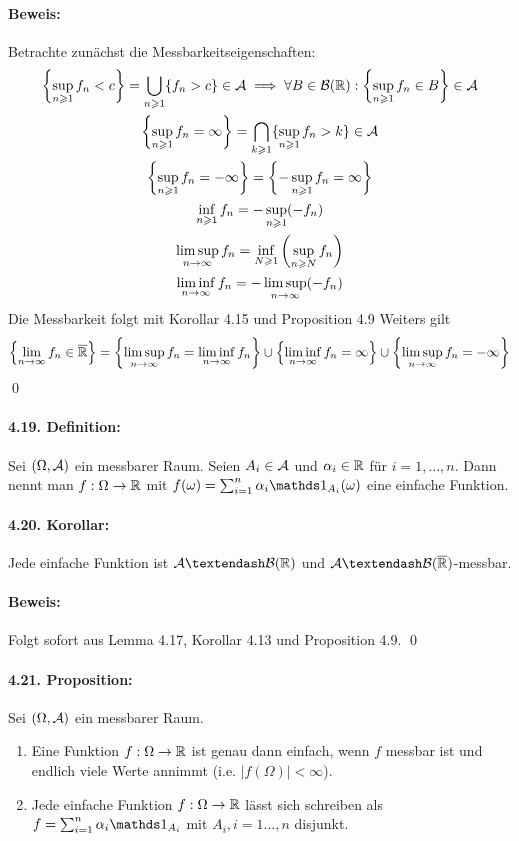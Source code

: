 \paragraph{Beweis:}Betrachte zun\"achst die Messbarkeitseigenschaften:
 \begin{gather*}
     \left\{\sup_{n\geqslant1}f_n<c\right\}=\bigcup_{n\geqslant1}\{f_n>c\}\in\mathcal{A}\implies\forall B\in\mathcal{B}(\mathbb{R}):\left\{\sup_{n\geqslant1}f_n\in B\right\}\in\mathcal{A} \\
     \left\{\sup_{n\geqslant1}f_n=\infty\right\}=\bigcap_{k\geqslant1}\{\sup_{n\geqslant1}f_n>k\}\in\mathcal{A}\\
     \left\{\sup_{n\geqslant1}f_n=-\infty\right\}=\left\{-\sup_{n\geqslant1}f_n=\infty\right\} \\ 
     \inf_{n\geqslant1}f_n=-\sup_{n\geqslant1}(-f_n) \\
     \limsup_{n\to\infty}f_n=\inf_{N\geqslant1}\left(\sup_{n\geqslant N}f_n\right) \\
     \liminf_{n\to\infty}f_n=-\limsup_{n\to\infty}(-f_n)
 \end{gather*}
 Die Messbarkeit folgt mit Korollar 4.15 und Proposition 4.9
 Weiters gilt
 $$\left\{\lim_{n\to\infty}f_n\in\overline{\mathbb{R}}\right\}=\left\{\limsup_{n\to\infty}f_n=\liminf_{n\to\infty}f_n\right\}\cup\left\{\liminf_{n\to\infty}f_n=\infty\right\}\cup\left\{\limsup_{n\to\infty}f_n=-\infty\right\}$$
 \qed
 
 \paragraph{4.19. Definition:}Sei $(\Omega,\mathcal{A})$ ein messbarer Raum. Seien $A_i\in\mathcal{A}$ und $\alpha_i\in\mathbb{R}$ f\"ur $i=1,\hdots,n$. Dann nennt man $f:\Omega\to\mathbb{R}$ mit $f(\omega)=\sum_{i=1}^n \alpha_i\ind{A_i}(\omega)$ eine einfache Funktion. 
 
 \paragraph{4.20. Korollar:}Jede einfache Funktion ist $\A\textendash\borel$ und $\A\textendash\cB(\overline\R)$-messbar.
 
 \paragraph{Beweis:}Folgt sofort aus Lemma 4.17, Korollar 4.13 und Proposition 4.9. \qed
 
 \paragraph{4.21. Proposition:}Sei $(\Omega,\mathcal{A})$ ein messbarer Raum.
\begin{enumerate}[label=(\roman*)]
    \item Eine Funktion $f:\Omega\to\mathbb{R}$ ist genau dann einfach, wenn $f$ messbar ist und endlich viele Werte annimmt (i.e. $|f(\Omega)|<\infty$). 
    \item Jede einfache Funktion $f:\Omega\to\mathbb{R}$ l\"asst sich schreiben als $f=\sum_{i=1}^n \alpha_i\ind{A_i}$ mit $A_i,i=1\hdots,n$ disjunkt.
\end{enumerate}

